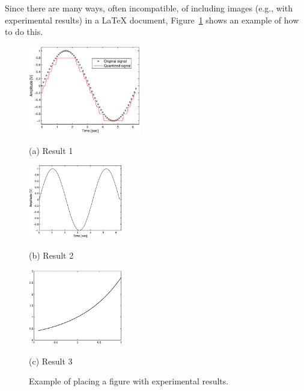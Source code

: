 \documentclass[a4paper]{article}
\begin{document}
Since there are many ways, often incompatible, of including images (e.g., with
experimental results) in a LaTeX document, Figure~\ref{fig:res} shows an example of how to do
this.

\begin{figure}

\begin{minipage}[b]{1.0\linewidth}
  \centering
  \centerline{\includegraphics[width=4.9cm]{image1.eps}}
  \small\centerline{(a) Result 1}\medskip
\end{minipage}
%
\begin{minipage}[b]{.48\linewidth}
  \centering
  \centerline{\includegraphics[width=4.1cm]{image2.eps}}
  \small\centerline{(b) Result 2}\medskip
\end{minipage}
\hfill
\begin{minipage}[b]{0.48\linewidth}
  \centering
  \centerline{\includegraphics[width=4.1cm]{image3.eps}}
  \small\centerline{(c) Result 3}\medskip
\end{minipage}
%
\vspace*{-0.3cm}
\caption{Example of placing a figure with experimental results.}
\label{fig:res}
%
\end{figure}
\end{document}
